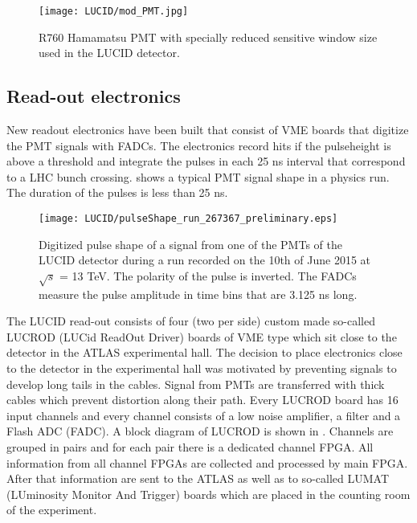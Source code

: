
\begin{figure}
\centering
\texttt{[image: LUCID/mod\_PMT.jpg]}
\caption{R760 Hamamatsu PMT with specially reduced sensitive window size used in the LUCID detector.}
\label{fig:modPMT}
\end{figure}

\subsection{Read-out electronics}
\label{subsec:LUCIDElectronics}

New readout electronics have been built that consist of VME boards that digitize the PMT signals with FADCs. 
The electronics record hits if the pulseheight is above a threshold and integrate the pulses in each 25 ns 
interval that correspond to a LHC bunch crossing.  shows a typical PMT signal shape in 
a physics run. The duration of the pulses is less than 25 ns.

\begin{figure}
\centering
\texttt{[image: LUCID/pulseShape\_run\_267367\_preliminary.eps]}
\caption{Digitized pulse shape of a signal from one of the PMTs of the LUCID detector during a run recorded on 
the 10th of June 2015 at $\sqrt{s}$ = 13 TeV. The polarity of the pulse is inverted. The FADCs measure the 
pulse amplitude in time bins that are 3.125 ns long.}
\label{fig:pulseShape}
\end{figure}

The LUCID read-out consists of four (two per side) custom made so-called LUCROD (LUCid ReadOut Driver) boards of VME type which sit close to the detector in the ATLAS experimental hall.
The decision to place electronics close to the detector in the experimental hall was motivated by preventing signals to develop long tails in the cables.
Signal from PMTs are transferred with thick cables which prevent distortion along their path.
Every LUCROD board has 16 input channels and every channel consists of a low noise amplifier, a filter and a Flash ADC (FADC).
A block diagram of LUCROD is shown in .
Channels are grouped in pairs and for each pair there is a dedicated channel FPGA.
All information from all channel FPGAs are collected and processed by main FPGA.
After that information are sent to the ATLAS as well as to so-called LUMAT (LUminosity Monitor And Trigger) boards which are placed in the counting room of the experiment.

